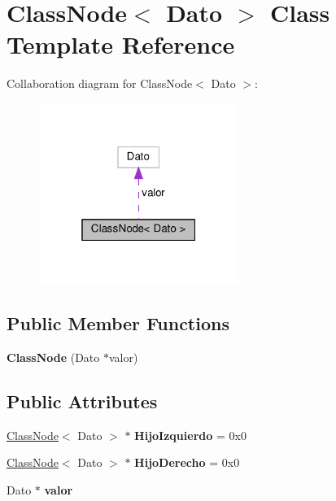 \hypertarget{class_class_node}{}\section{Class\+Node$<$ Dato $>$ Class Template Reference}
\label{class_class_node}


Collaboration diagram for Class\+Node$<$ Dato $>$\+:\nopagebreak
\begin{figure}[H]
\begin{center}
\leavevmode
\includegraphics[width=184pt]{class_class_node__coll__graph}
\end{center}
\end{figure}
\subsection*{Public Member Functions}
\begin{DoxyCompactItemize}
\item 
\mbox{\label{class_class_node_ac14b1ea4ba58bd16d53c2fdc0778bbda}} 
{\bfseries Class\+Node} (Dato $\ast$valor)
\end{DoxyCompactItemize}
\subsection*{Public Attributes}
\begin{DoxyCompactItemize}
\item 
\mbox{\label{class_class_node_ac29f0086e122a3114b8130d1ba58d010}} 
\hyperlink{class_class_node}{Class\+Node}$<$ Dato $>$ $\ast$ {\bfseries Hijo\+Izquierdo} = 0x0
\item 
\mbox{\label{class_class_node_a0fbbfce087dba9ffa6d1c67bc9e0b58c}} 
\hyperlink{class_class_node}{Class\+Node}$<$ Dato $>$ $\ast$ {\bfseries Hijo\+Derecho} = 0x0
\item 
\mbox{\label{class_class_node_a0a597e54b607022b1486e254d8a64880}} 
Dato $\ast$ {\bfseries valor}
\end{DoxyCompactItemize}


